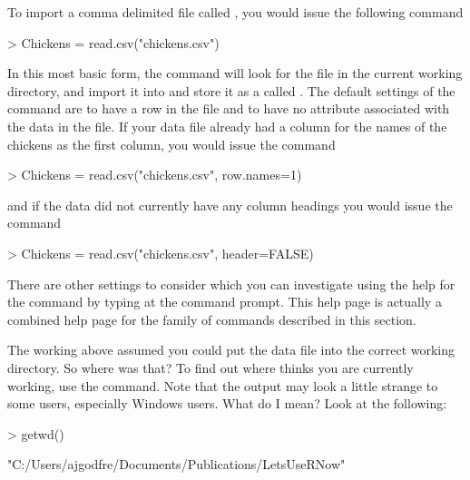 To import a comma delimited file called , you would issue the following command
\begin{Schunk}
\begin{Sinput}
> Chickens = read.csv("chickens.csv")
\end{Sinput}
\end{Schunk}
In this most basic form, the 
 command will look for the  file in the current working directory, and import it into \R{} and store it as a  called . The default settings of the  command are to have a  row in the file and to have no  attribute associated with the data in the file. If your data file already had a column for the names of the chickens as the first column, you would issue the command
\begin{Schunk}
\begin{Sinput}
> Chickens = read.csv("chickens.csv", row.names=1)
\end{Sinput}
\end{Schunk}
and if the data did not currently have any column headings you would issue the command
\begin{Schunk}
\begin{Sinput}
> Chickens = read.csv("chickens.csv", header=FALSE)
\end{Sinput}
\end{Schunk}

There are other settings to consider which you can investigate using the help for the  command by typing  at the command prompt. This help page is actually a combined help page for the family of commands described in this section.

The working above assumed you could put the data file into the correct working directory.  So where was that? To find out where \R{} thinks you are currently working, use the  command. Note that the output may look a little strange to some users, especially Windows users. What do I mean? Look at the following:
\begin{Schunk}
\begin{Sinput}
> getwd()
\end{Sinput}
\begin{Soutput}
[1] "C:/Users/ajgodfre/Documents/Publications/LetsUseRNow"
\end{Soutput}
\end{Schunk}

